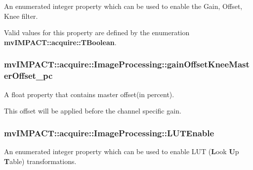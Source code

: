 An enumerated integer property which can be used to enable the Gain, Offset, Knee filter. 

Valid values for this property are defined by the enumeration {\bfseries mv\+I\+M\+P\+A\+C\+T\+::acquire\+::\+T\+Boolean}. \hypertarget{classmv_i_m_p_a_c_t_1_1acquire_1_1_image_processing_ad5b601b18f53f6b93f8f058225fae0ec}{
\subsubsection[{gain\+Offset\+Knee\+Master\+Offset\+\_\+pc}]{ mv\+I\+M\+P\+A\+C\+T\+::acquire\+::\+Image\+Processing\+::gain\+Offset\+Knee\+Master\+Offset\+\_\+pc}}\label{classmv_i_m_p_a_c_t_1_1acquire_1_1_image_processing_ad5b601b18f53f6b93f8f058225fae0ec}


A float property that contains master offset(in percent). 

This offset will be applied before the channel specific gain. \hypertarget{classmv_i_m_p_a_c_t_1_1acquire_1_1_image_processing_a7f8eb83578d97fde3405e6ae5d09e5c3}{
\subsubsection[{L\+U\+T\+Enable}]{ mv\+I\+M\+P\+A\+C\+T\+::acquire\+::\+Image\+Processing\+::\+L\+U\+T\+Enable}}\label{classmv_i_m_p_a_c_t_1_1acquire_1_1_image_processing_a7f8eb83578d97fde3405e6ae5d09e5c3}


An enumerated integer property which can be used to enable L\+U\+T ({\bfseries L}ook {\bfseries U}p {\bfseries T}able) transformations. 

